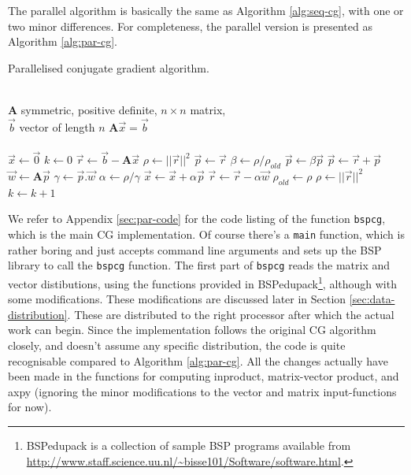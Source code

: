 \documentclass[a4paper]{article}
\newcommand{\ve}[1]{\ensuremath{\vec{#1}}}
\newcommand{\mat}[1]{\ensuremath{\boldsymbol{#1}}}
\begin{document}
The parallel algorithm is basically the same as Algorithm \ref{alg:seq-cg}, with one
or two minor differences. For completeness, the parallel version is presented as Algorithm
\ref{alg:par-cg}.

\begin{algorithm}
    \caption{Parallelised conjugate gradient algorithm.}
\label{alg:par-cg}
\begin{algorithmic}
    \REQUIRE ~\\
             $\mat A$ symmetric, positive definite, $n\times n$ matrix,\\
             $\ve  b$ vector of length $n$
    \ENSURE  $\mat A \ve x = \ve b$\\~\\
    \STATE $\ve x \leftarrow \ve{0}$ 
    \STATE $k \leftarrow 0$ 
    \STATE $\ve r \leftarrow \ve b - \mat A \ve x$
    \STATE $\rho \leftarrow ||\ve r||^2$ 
    \WHILE{$\sqrt{\rho} > \epsilon ||\ve b|| \wedge k < k_{max}$}
        \STATE $\ve p \leftarrow \ve r$ 
        \ELSE
            \STATE $\beta \leftarrow \rho/\rho_{old}$
            \STATE $\ve p \leftarrow \beta \ve p$
            \STATE $\ve p \leftarrow \ve r + \ve p$
        \ENDIF
        \STATE $\vec w \leftarrow \mat A \ve p$ 
        \STATE $\gamma \leftarrow \ve p . \ve w$ 
        \STATE $\alpha \leftarrow \rho/\gamma$
        \STATE $\ve x  \leftarrow \ve x + \alpha \ve p$
        \STATE $\ve r  \leftarrow \ve r - \alpha \ve w$
        \STATE $\rho_{old} \leftarrow \rho$
        \STATE $\rho   \leftarrow || \ve r || ^2$ 
        \STATE $k \leftarrow k+1$
    \ENDWHILE
\end{algorithmic}
\end{algorithm}

We refer to Appendix \ref{sec:par-code} for the code listing of the function
\texttt{bspcg}, which is the main CG implementation. Of course there's a
\texttt{main} function, which is rather boring and just accepts command line
arguments and sets up the BSP library to call the \texttt{bspcg} function.  The
first part of \texttt{bspcg} reads the matrix and vector distibutions, using
the functions provided in BSPedupack\footnote{BSPedupack is a collection of
sample BSP programs available from
\url{http://www.staff.science.uu.nl/~bisse101/Software/software.html}.},
although with some modifications. These modifications are discussed later
in Section \ref{sec:data-distribution}. These are distributed to the right
processor after which the actual work can begin. Since the implementation
follows the original CG algorithm closely, and doesn't assume any specific
distribution, the code is quite recognisable compared to Algorithm
\ref{alg:par-cg}. All the changes actually have been made in the functions
for computing inproduct, matrix-vector product, and axpy (ignoring the
minor modifications to the vector and matrix input-functions for now).
\end{document}
